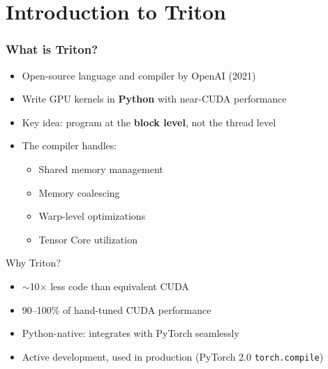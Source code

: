 \documentclass[aspectratio=169]{beamer}
\begin{document}
\section{Introduction to Triton}

\begin{frame}
	\frametitle{What is Triton?}
	\begin{itemize}
		\item Open-source language and compiler by OpenAI (2021)
		\item Write GPU kernels in \textbf{Python} with near-CUDA performance
		\item Key idea: program at the \textbf{block level}, not the thread level
		\item The compiler handles:
		      \begin{itemize}
			      \item Shared memory management
			      \item Memory coalescing
			      \item Warp-level optimizations
			      \item Tensor Core utilization
		      \end{itemize}
	\end{itemize}
	\vspace{0.5em}
	\begin{block}{Why Triton?}
		\begin{itemize}
			\item $\sim$10$\times$ less code than equivalent CUDA
			\item 90--100\% of hand-tuned CUDA performance
			\item Python-native: integrates with PyTorch seamlessly
			\item Active development, used in production (PyTorch 2.0 \texttt{torch.compile})
		\end{itemize}
	\end{block}
\end{frame}
\end{document}
